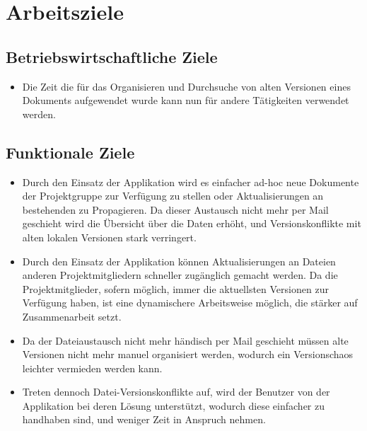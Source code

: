 
\section{Arbeitsziele}

\subsection{Betriebswirtschaftliche Ziele}
\begin{itemize}
\item Die Zeit die für das Organisieren und Durchsuche von alten Versionen eines Dokuments aufgewendet wurde kann nun für andere Tätigkeiten verwendet werden.
\end{itemize}

\subsection{Funktionale Ziele}
\begin{itemize}
\item Durch den Einsatz der Applikation wird es einfacher ad-hoc neue Dokumente der Projektgruppe zur Verfügung zu stellen oder Aktualisierungen an bestehenden zu Propagieren. Da dieser Austausch nicht mehr per Mail geschieht wird die Übersicht über die Daten erhöht, und Versionskonflikte mit alten lokalen Versionen stark verringert.

\item Durch den Einsatz der Applikation können Aktualisierungen an Dateien anderen Projektmitgliedern schneller zugänglich gemacht werden. Da die Projektmitglieder, sofern möglich, immer die aktuellsten Versionen zur Verfügung haben, ist eine dynamischere Arbeitsweise möglich, die stärker auf Zusammenarbeit setzt.

\item Da der Dateiaustausch nicht mehr händisch per Mail geschieht müssen alte Versionen nicht mehr manuel organisiert werden, wodurch ein Versionschaos leichter vermieden werden kann.

\item Treten dennoch Datei-Versionskonflikte auf, wird der Benutzer von der Applikation bei deren Lösung unterstützt, wodurch diese einfacher zu handhaben sind, und weniger Zeit in Anspruch nehmen.

\end{itemize}


